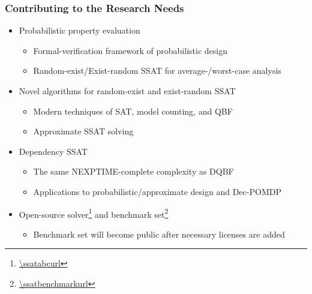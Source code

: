 \begin{frame}
      \frametitle{Contributing to the Research Needs}
      \begin{itemize}
            \item Probabilistic property evaluation
                  \pause
                  \begin{itemize}
                        \item Formal-verification framework of probabilistic design
                              \pause
                        \item Random-exist/Exist-random SSAT for average-/worst-case analysis
                              \pause
                  \end{itemize}
            \item Novel algorithms for random-exist and exist-random SSAT
                  \pause
                  \begin{itemize}
                        \item Modern techniques of SAT, model counting, and QBF
                              \pause
                        \item Approximate SSAT solving
                              \pause
                  \end{itemize}
            \item Dependency SSAT
                  \pause
                  \begin{itemize}
                        \item The same NEXPTIME-complete complexity as DQBF
                              \pause
                        \item Applications to probabilistic/approximate design and Dec-POMDP
                              \pause
                  \end{itemize}
            \item Open-source solver\footnote{\url{\ssatabcurl}} and benchmark set\footnote{\url{\ssatbenchmarkurl}}
                  \pause
                  \begin{itemize}
                        \item Benchmark set will become public after necessary licenses are added
                  \end{itemize}
      \end{itemize}
\end{frame}